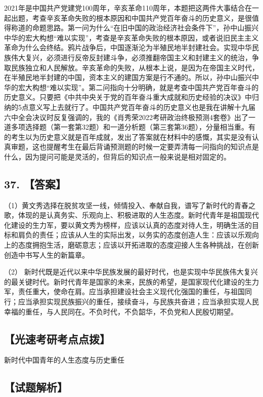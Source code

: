 \documentclass[UTF8,11pt]{ctexart}
\begin{document}
2021年是中国共产党建党100周年，辛亥革命110周年，本题把这两件大事结合在一起出题，考查辛亥革命失败的根本原因和中国共产党百年奋斗的历史意义，是很值得称道的命题思路。第一问为什么“在旧中国的政治经济社会条件下”，孙中山振兴中华的宏大构想“难以实现”，考查是辛亥革命失败的根本原因，或者说旧民主主义革命为什么会终结。鸦片战争后，中国逐渐沦为半殖民地半封建社会。实现中华民族伟大复兴，必须进行反帝反封建斗争，必须推翻帝国主义和封建主义的统治，争取民族独立和人民解放。辛亥革命的失败，从根本上说，是因为在帝国主义时代，在半殖民地半封建的中国，资本主义的建国方案是行不通的。所以，孙中山振兴中华的宏大构想“难以实现”。第二问指向十分明确，就是考查中国共产党百年奋斗的历史意义。只要把《中共中央关于党的百年奋斗重大成就和历史经验的决议》中归纳的5点意义写上去就行了。中国共产党百年奋斗的历史意义也是我在讲解十九届六中全会决议时反复强调的，我的《肖秀荣2022考研政治终极预测4套卷》出了一道多项选择题（第一套第32题）和一道分析题（第三套第36题），分量相当重。有的考生以为历史意义就是百年成就，发出了答案就在材料中的感慨，其实是没有认真审题，这也提醒考生在最后背诵预测题的时候一定要弄清每一问指向的知识点是什么，因为提问可能是灵活的，但背后的知识点一般来说是相对固定的。


\subsection*{37. 【答案】}

（1）黄文秀选择在脱贫攻坚一线，倾情投入、奉献自我，谱写了新时代的青春之歌，体现的是认真务实、乐观向上、积极进取的人生态度。新时代青年是祖国现代化建设的生力军，要以黄文秀为榜样，应该以认真的态度对待人生，明确生活的目标和肩负的责任；应该从人生的实际出发，以务实的态度创造人生：应该以乐观向上的态度拥抱生活，磨砺意志；应该以开拓进取的态度迎接人生各种挑战，在创新创造中书写人生的新篇章。


（2） 新时代既是近代以来中华民族发展的最好时代，也是实现中华民族伟大复兴的最关键时代。新时代青年是国家的未来，民族的希望，是国家现代化建设的生力军，责任重大，使命在肩。应当承担建设社会主义现代化强国的重任，与祖国同行；应当承担实现民族振兴的重任，接续奋斗，与民族共奋进；应当承担实现人民幸福的重任，与人民同在。不负时代，不负韶华，不负党和人民殷切期望。


\subsection*{【光速考研考点点拨】}

新时代中国青年的人生态度与历史重任


\subsection*{【试题解析】}
\end{document}
